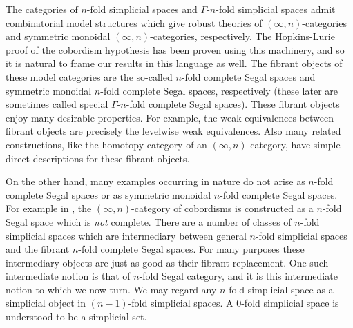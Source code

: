 \documentclass{amsart}
\begin{document}
The categories of $n$-fold simplicial spaces and $\Gamma$-$n$-fold simplicial spaces admit combinatorial model structures which give robust theories of $(\infty, n)$-categories and symmetric monoidal $(\infty, n)$-categories, respectively. 
The Hopkins-Lurie proof of the cobordism hypothesis has been proven using this machinery, and so it is natural to  frame our results in this language as well. The fibrant objects of these model categories are the so-called $n$-fold complete Segal spaces and symmetric monoidal $n$-fold complete Segal spaces, respectively (these later are sometimes called special $\Gamma$-$n$-fold complete Segal spaces).
These fibrant objects enjoy many desirable properties. For example, the weak equivalences between fibrant objects are precisely the levelwise weak equivalences. Also many related constructions, like the homotopy category of an $(\infty, n)$-category, have simple direct descriptions for these fibrant objects. 

On the other hand, many examples occurring { in nature} do not arise as $n$-fold complete Segal spaces or as symmetric monoidal $n$-fold complete Segal spaces. For example in \cite{MR2555928}, the $(\infty, n)$-category of cobordisms is constructed as a $n$-fold Segal space which is {\em not} complete. There are a number of classes of $n$-fold simplicial spaces which are intermediary between general $n$-fold simplicial spaces and the fibrant $n$-fold complete Segal spaces. For many purposes these intermediary objects are just as good as their fibrant replacement. One such intermediate notion is that of $n$-fold Segal category, and it is this intermediate notion to which we now turn. 
%
We may regard any $n$-fold simplicial space as a simplicial object in $(n-1)$-fold simplicial spaces. A $0$-fold simplicial space is understood to be a simplicial set.
\end{document}
